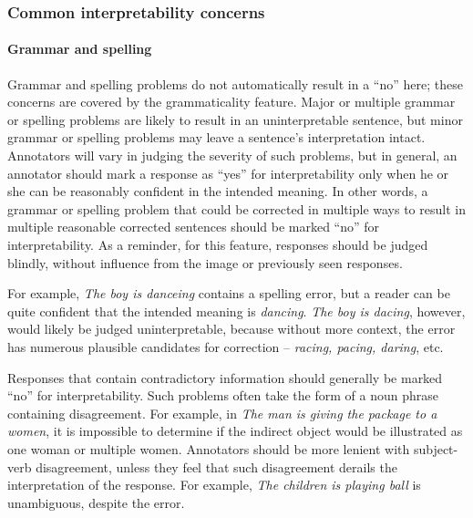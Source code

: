 \documentclass[12pt,notitlepage]{article}
\begin{document}
\subsubsection{Common interpretability concerns}

\paragraph{Grammar and spelling} \label{para:interp-grammar} Grammar and spelling problems do not automatically result in a ``no'' here; these concerns are covered by the grammaticality feature. Major or multiple grammar or spelling problems are likely to result in an uninterpretable sentence, but minor grammar or spelling problems may leave a sentence's interpretation intact. Annotators will vary in judging the severity of such problems, but in general, an annotator should mark a response as ``yes'' for interpretability only when he or she can be reasonably confident in the intended meaning. In other words, a grammar or spelling problem that could be corrected in multiple ways to result in multiple reasonable corrected sentences should be marked ``no'' for interpretability. As a reminder, for this feature, responses should be judged blindly, without influence from the image or previously seen responses.

For example, \textit{The boy is danceing} contains a spelling error, but a reader can be quite confident that the intended meaning is \textit{dancing}. \textit{The boy is dacing}, however, would likely be judged uninterpretable, because without more context, the error has numerous plausible candidates for correction -- \textit{racing, pacing, daring}, etc.

Responses that contain contradictory information should generally be marked ``no'' for interpretability. Such problems often take the form of a noun phrase containing disagreement. For example, in \textit{The man is giving the package to a women}, it is impossible to determine if the indirect object would be illustrated as one woman or multiple women. Annotators should be more lenient with subject-verb disagreement, unless they feel that such disagreement derails the interpretation of the response. For example, \textit{The children is playing ball} is unambiguous, despite the error.



\end{document}
